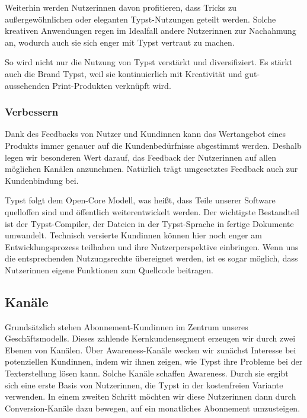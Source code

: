 \documentclass[11pt, a4paper]{article}
\newcommand{\gender}{\raisebox{-.25em}{*}}
\renewcommand{\glossary} {\marginsymbol{\textbf{↪}}}
\newcommand{\marginsymbol}[1] {\protect\marginsymbolhelper{#1}}
\newcommand{\marginsymbolhelper}[1] {\tabto*{-1cm}\makebox[0cm]{#1}\tabto*{\TabPrevPos}}
\begin{document}
Weiterhin werden Nutzer\gender{}innen davon profitieren, dass Tricks zu außergewöhnlichen oder eleganten Typst-Nutzungen geteilt werden. Solche kreativen Anwendungen regen im Idealfall andere Nutzer\gender{}innen zur Nachahmung an, wodurch auch sie sich enger mit Typst vertraut zu machen.

So wird nicht nur die Nutzung von Typst verstärkt und diversifiziert. Es stärkt auch die Brand Typst, weil sie kontinuierlich mit Kreativität und gut-aussehenden Print-Produkten verknüpft wird.

\subsubsection*{Verbessern}

Dank des Feedbacks von Nutzer\gender{} und Kund\gender{}innen kann das Wertangebot eines Produkts immer genauer auf die Kundenbedürfnisse abgestimmt werden. Deshalb legen wir besonderen Wert darauf, das Feedback der Nutzer\gender{}innen auf allen möglichen Kanälen anzunehmen. Natürlich trägt umgesetztes Feedback auch zur Kundenbindung bei.

Typst folgt dem Open-Core Modell, was heißt, dass Teile unserer Software quelloffen sind und öffentlich weiterentwickelt werden. Der wichtigste Bestandteil ist der \glossary Typst-Compiler, der Dateien in der Typst-Sprache in fertige Dokumente umwandelt. Technisch versierte Kund\gender{}innen können hier noch enger am Entwicklungsprozess teilhaben und ihre Nutzerperspektive einbringen. Wenn uns die entsprechenden Nutzungsrechte übereignet werden, ist es sogar möglich, dass Nutzer\gender{}innen eigene Funktionen zum Quellcode beitragen.


\newpage
\subsection*{Kanäle}

Grundsätzlich stehen Abonnement-Kund\gender{}innen im Zentrum unseres Geschäftsmodells. Dieses zahlende Kernkundensegment erzeugen wir durch zwei Ebenen von Kanälen. Über Awareness-Kanäle wecken wir zunächst Interesse bei potenziellen Kund\gender{}innen, indem wir ihnen zeigen, wie Typst ihre Probleme bei der Texterstellung lösen kann. Solche Kanäle schaffen Awareness. Durch sie ergibt sich eine erste Basis von Nutzer\gender{}innen, die Typst in der kostenfreien Variante verwenden. In einem zweiten Schritt möchten wir diese Nutzer\gender{}innen dann durch Conversion-Kanäle dazu bewegen, auf ein monatliches Abonnement umzusteigen.
\end{document}
